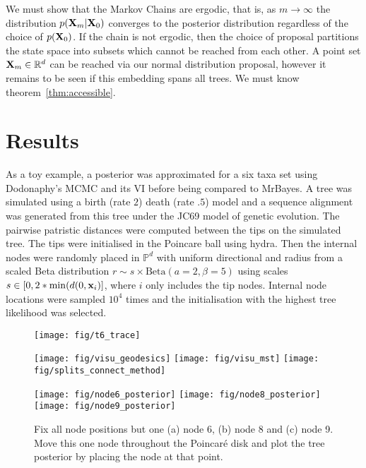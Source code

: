 \documentclass[11pt]{article}
\begin{document}
We must show that the Markov Chains are ergodic, that is, as $m \to \infty$ the distribution $p(\bold{X}_{m}|\bold{X}_{0})$ converges to the posterior distribution regardless of the choice of $p(\bold{X}_{0})$.
If the chain is not ergodic, then the choice of proposal partitions the state space into subsets which cannot be reached from each other.
A point set $\bold{X}_{m} \in \mathbb{R}^{d}$ can be reached via our normal distribution proposal, however it remains to be seen if this embedding spans all trees.
We must know theorem~\ref{thm:accessible}.

\section{Results}
As a toy example, a posterior was approximated for a six taxa set using Dodonaphy's MCMC and its VI before being compared to MrBayes.
A tree was simulated using a birth (rate $2$) death (rate $.5$) model and a sequence alignment was generated from this tree under the JC69 model of genetic evolution.
The pairwise patristic distances were computed between the tips on the simulated tree.
The tips were initialised in the Poincare ball using hydra.
Then the internal nodes were randomly placed in $\mathbb{P}^{d}$ with uniform directional and radius from a scaled Beta distribution $ r \sim s \times \text{Beta}(a=2, \beta=5)$ using scales $s \in [0, 2*\min(d(0, \bold{x}_{i})]$, where $i$ only includes the tip nodes.
Internal node locations were sampled $10^{4}$ times and the initialisation with the highest tree likelihood was selected.


\begin{figure}[htbp]
\begin{center}
\texttt{[image: fig/t6\_trace]}
\end{center}
\end{figure}

\begin{figure}[htbp]
\begin{center}
\texttt{[image: fig/visu\_geodesics]}%
\texttt{[image: fig/visu\_mst]}
\texttt{[image: fig/splits\_connect\_method]}
\end{center}
\end{figure}

\begin{figure}[htbp]
\begin{center}
\texttt{[image: fig/node6\_posterior]}%
\texttt{[image: fig/node8\_posterior]}%
\texttt{[image: fig/node9\_posterior]}
\end{center}
\caption{Fix all node positions but one (a) node 6, (b) node 8 and (c) node 9. Move this one node throughout the Poincaré disk and plot the tree posterior by placing the node at that point.}
\end{figure}
\end{document}
